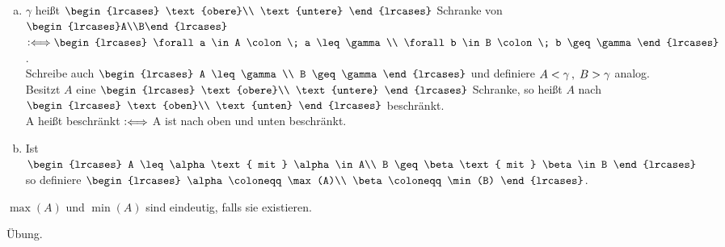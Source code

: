 \documentclass[../ana1.tex]{subfiles}
\begin{document}
\begin{defi*}\leavevmode
	\begin{enumerate}[(a)]
		\item \(\gamma\) heißt \(\begin{lrcases}
									\text{obere}\\
									\text{untere}
								 \end{lrcases}\) Schranke von \(\begin{lrcases}A\\B\end{lrcases}\)
			  \(\longeq \begin{lrcases}
							\forall a \in A \colon \; a \leq \gamma\\
							\forall b \in B \colon \; b \geq \gamma  
						\end{lrcases}\).\\
			  Schreibe auch \(\begin{lrcases}
								 A \leq \gamma\\ 
								 B \geq \gamma 
							  \end{lrcases}\)
			  und definiere \(A < \gamma \operatorname{,} \; B > \gamma\) analog.\\
			  Besitzt \(A\) eine \(\begin{lrcases}
									  \text{obere}\\
									  \text{untere}
								   \end{lrcases}\) Schranke,
			  so heißt \(A\) nach \(\begin{lrcases}
									  \text{oben}\\
									  \text{unten}
								   \end{lrcases}\) beschränkt.\\
			  A heißt beschränkt \(\mathrel{\vcentcolon\Longleftrightarrow}\) A ist nach oben und unten beschränkt.
		\item Ist \(\begin{lrcases}
						A \leq \alpha \text{ mit } \alpha \in A\\
						B \geq \beta \text{ mit } \beta \in B
					\end{lrcases}\) so definiere
			  \(\begin{lrcases}
					\alpha \coloneqq \max(A)\\
					\beta \coloneqq \min(B)
				\end{lrcases}\).
	\end{enumerate}
\end{defi*}

\begin{bem}
	\(\max(A)\) und \(\min(A)\) sind eindeutig, falls sie existieren.
\end{bem}
\begin{bew}
	Übung.\phantom{\qedhere}
\end{bew}
\end{document}
